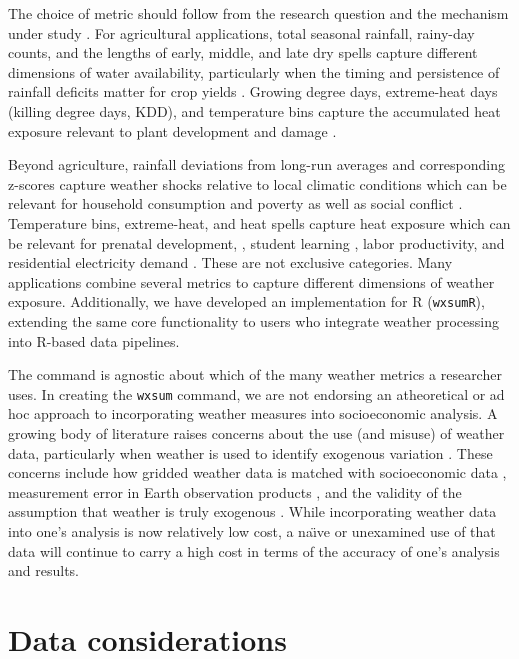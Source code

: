 The choice of metric should follow from the research question and the mechanism under study \citep{MichlerEtAl26}. For agricultural applications, total seasonal rainfall, rainy-day counts, and the lengths of early, middle, and late dry spells capture different dimensions of water availability, particularly when the timing and persistence of rainfall deficits matter for crop yields \citep{MarcosGarciaEtAl24}. Growing degree days, extreme-heat days (killing degree days, KDD), and temperature bins capture the accumulated heat exposure relevant to plant development and damage \citep{SchlenkerRoberts09}.

Beyond agriculture, rainfall deviations from long-run averages and corresponding z-scores capture weather shocks relative to local climatic conditions which can be relevant for household consumption and poverty \citep{AzzarriSignorelli20} as well as social conflict \citep{HendrixSalehyan12}. Temperature bins, extreme-heat, and heat spells capture heat exposure which can be relevant for prenatal development, \citep{DoyleLeckning25}, student learning \citep{ParkEtAl20}, labor productivity\citep{SomanathanEtAl21}, and residential electricity demand \citep{AuffhammerAroonruengsawat11}. These are not exclusive categories. Many applications combine several metrics to capture different dimensions of weather exposure. Additionally, we have developed an implementation for R (\texttt{wxsumR}), extending the same core functionality to users who integrate weather processing into R-based data pipelines.

The command is agnostic about which of the many weather metrics a researcher uses. In creating the \texttt{wxsum} command, we are not endorsing an atheoretical or ad hoc approach to incorporating weather measures into socioeconomic analysis. A growing body of literature raises concerns about the use (and misuse) of weather data, particularly when weather is used to identify exogenous variation \citep{BenamiEtAl26}. These concerns include how gridded weather data is matched with socioeconomic data \citep{MichlerEtAl22}, measurement error in Earth observation products \citep{ProctorEtAl23, JosephsonEtAl26}, and the validity of the assumption that weather is truly exogenous \citep{Sarsons15, Mellon2023-un}. While incorporating weather data into one's analysis is now relatively low cost, a na\"{\i}ve or unexamined use of that data will continue to carry a high cost in terms of the accuracy of one's analysis and results.

\section{Data considerations}

